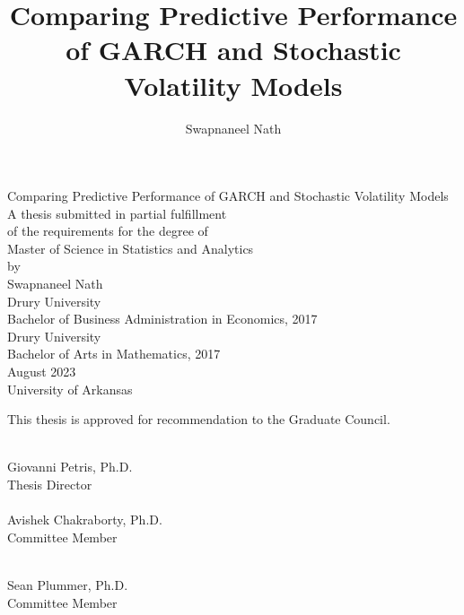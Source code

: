 \documentclass[12pt,letterpaper,reqno,fleqn]{article}
\author{Swapnaneel Nath}
\begin{document}
\title{Comparing Predictive Performance of GARCH and Stochastic Volatility Models}
\thispagestyle{empty}
\begin{singlespace}
\begin{center}
	{Comparing Predictive Performance of GARCH and Stochastic Volatility Models} \\
	\vspace{0.5in}
	A thesis submitted in partial fulfillment\\
	of the requirements for the degree of\\
	{Master of Science in Statistics and Analytics}\\
	\vspace{0.5in}
	by\\
	\vspace{0.5in}
	{Swapnaneel Nath}\\
	Drury University\\
        Bachelor of Business Administration in Economics, 2017\\
        Drury University \\
	Bachelor of Arts in Mathematics, 2017\\
	\vspace{0.5in}
	August 2023\\
	University of Arkansas\\
	\end{center}
\begin{flushleft}
\vspace{0.75in}
This thesis is approved for recommendation to the Graduate Council.\\

\vspace{0.75in}
\begin{minipage}[b]{0.48\textwidth}
\makebox[\textwidth]{\hrulefill}\\
Giovanni Petris, Ph.D.\\
Thesis Director\\[0.5in]
\makebox[\textwidth]{\hrulefill}\\
Avishek Chakraborty, Ph.D.\\
Committee Member\\[0.5in]
\end{minipage}
\hfill
\begin{minipage}[b]{0.48\textwidth}
\makebox[\textwidth]{\hrulefill}\\
Sean Plummer, Ph.D.\\
Committee Member\\[0.5in]
\end{minipage}
\end{flushleft}
\end{singlespace}
\end{document}
